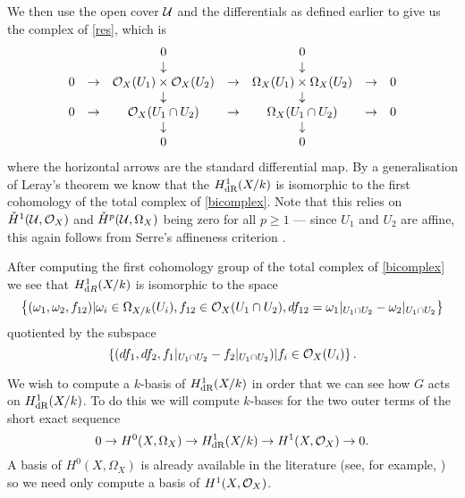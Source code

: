 We then use the open cover $\cal U$ and the \cech differentials as defined earlier to give us the \cech complex of \eqref{res}, which is
\begin{equation}\label{bicomplex} \begin{array}{ccccccc}
~ & ~ & 0 & ~ & 0 & ~ & ~ \\
~ & ~ & \downarrow & ~ & \downarrow & ~ & ~ \\
0 & \rightarrow & {\cal O}_X(U_1)\times {\cal O}_X(U_2) & \rightarrow & \Omega_X(U_1)\times \Omega_X(U_2) & \rightarrow & 0 \\
~ & ~ & \downarrow & ~ & \downarrow & ~ & ~ \\
0 & \rightarrow & {\cal O}_X(U_1 \cap U_2) & \rightarrow & \Omega_X(U_1 \cap U_2) & \rightarrow & 0 \\
~ & ~ & \downarrow & ~ & \downarrow & ~ & ~ \\
~ & ~ & 0 & ~ & 0 & ~ & ~ \\
\end{array}
\end{equation}
where the horizontal arrows are the standard differential map.
By a generalisation of Leray's theorem \cite[Cor. 12.4.7]{EGA0III} we know that the $H_{\text {dR}}^1(X/k)$ is isomorphic to the first cohomology of the total complex of \eqref{bicomplex}.
Note that this relies on $\check{H}^1(\mathcal U,\mathcal O_X)$ and ${\check H}^p({\mathcal U}, \Omega_X)$ being zero for all $p\geq 1$ ---
since $U_1$ and $U_2$ are affine, this again follows from Serre's affineness criterion \cite[Thm 5.2.23]{liu}.



After computing the first cohomology group of the total complex of \eqref{bicomplex} we see that $H^1_{{\text dR}}(X/k)$ is isomorphic to the space
\begin{equation}\label{derhamconditions}
\left\{(\omega_1, \omega_2, f_{12}) | \omega_i\in \Omega_{X/k}(U_i), f_{12}\in {\cal O}_X(U_1 \cap U_2), df_{12} = \omega_1|_{U_1\cap U_2} - \omega_2|_{U_1\cap U_2} \right\}
\end{equation}
quotiented by the subspace
\begin{equation}\label{quotient}
\left\{  (df_1, df_2, f_1|_{U_1\cap U_2} -f_2|_{U_1\cap U_2} )|f_i \in {\cal O}_X(U_i)\right\}.
\end{equation}

We wish to compute a $k$-basis of $H_{\text {dR}}^1(X/k)$ in order that we can see how $G$ acts on $H_{\text {dR}}^1(X/k)$.
To do this we will compute $k$-bases for the two outer terms of the short exact sequence
\begin{equation}\label{ses}
0 \rightarrow H^0(X,\Omega_X) \rightarrow H_{\text {dR}}^1(X/k) \rightarrow H^1(X,{\cal O}_X) \rightarrow 0.
\end{equation}
A basis of $H^0(X,\Omega_X)$ is already available in the literature (see, for example, \cite[Prop. 7.4.26]{liu}) so we need only compute a basis of $H^1(X,{\cal O}_X)$.

